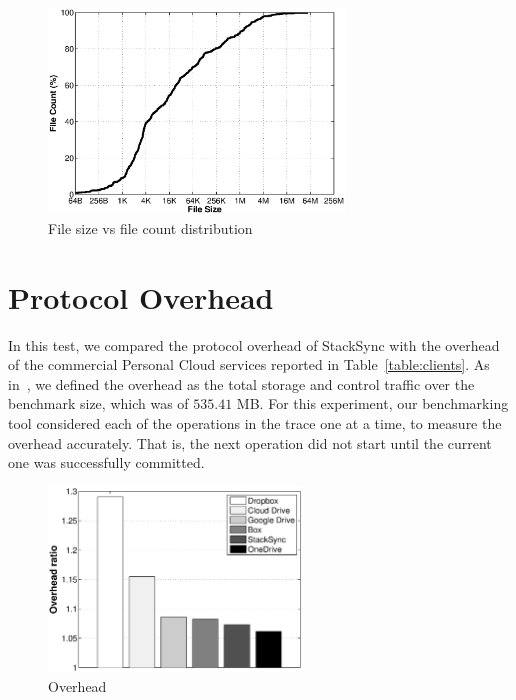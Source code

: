 \begin{figure}[t]
  \centering
  \includegraphics[width=0.7\textwidth]{figures/cdf_files}
  \caption{File size vs file count distribution}
  \label{fig:cdf_files}
\end{figure}

\section{Protocol Overhead}
In this test, we compared the protocol overhead of StackSync with the overhead of the
commercial Personal Cloud services reported in Table~\ref{table:clients}. As in~\cite{drago2013benchmarking},
we defined the overhead as the total storage and control traffic over the benchmark size, which was of 
$535.41$ MB. For this experiment, our benchmarking tool considered each of the operations in the trace one at a time,
to measure the overhead accurately. That is, the next operation did not start until the current one was
successfully committed.

\begin{figure}[h]
  \centering
  \label{fig:overhead_clients}
  \includegraphics[width=0.6\textwidth]{figures/overhead_clients}
  \caption{Overhead}
\end{figure}

